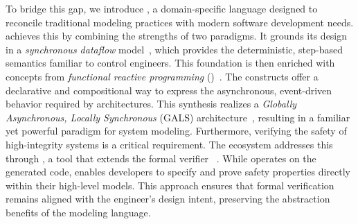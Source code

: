 To bridge this gap, we introduce \GRust, a domain-specific language designed to reconcile
traditional modeling practices with modern software development needs.
%
\GRust achieves this by combining the strengths of two paradigms. It grounds its design in a
\emph{synchronous dataflow} model~\cite{%
    DBLP:conf/ifip/Kahn74,%
    DBLP:conf/popl/CaspiPHP87,%
    DBLP:conf/tase/ColacoPP17%
}, which provides the deterministic, step-based semantics familiar to control engineers. This
foundation is then enriched with concepts from \emph{functional reactive programming} (\frp)~\cite{%
    DBLP:conf/icfp/ElliottH97,%
    DBLP:conf/haskell/Elliott09,%
    DBLP:conf/padl/WanTH02%
}. The \frp constructs offer a declarative and compositional way to express the asynchronous,
event-driven behavior required by \sdv architectures. This synthesis realizes a \emph{Globally
    Asynchronous, Locally Synchronous} (GALS) architecture~\cite{DBLP:phd/us/Chapiro85}, resulting
in a familiar yet powerful paradigm for system modeling.
%
Furthermore, verifying the safety of high-integrity systems is a critical requirement. The \GRust
ecosystem addresses this through \GReusot, a tool that extends the formal verifier
\Creusot~\cite{DBLP:conf/icfem/DenisJM22}. While \Creusot operates on the generated \Rust code,
\GReusot enables developers to specify and prove safety properties directly within their high-level
\GRust models. This approach ensures that formal verification remains aligned with the engineer's
design intent, preserving the abstraction benefits of the modeling language.

